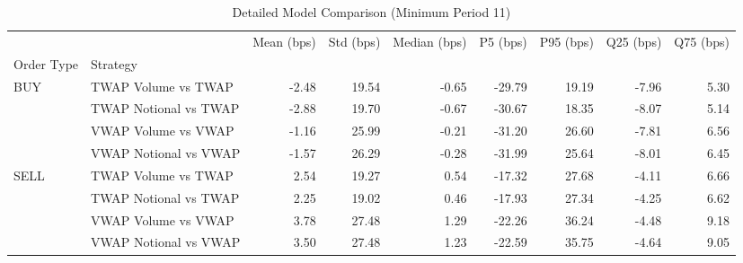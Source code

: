 \begin{table}
\caption{Detailed Model Comparison (Minimum Period 11)}
\label{tab:detailed_min_period_11}
\begin{tabular}{l|l|rrrrrrr}
\toprule
 &  & Mean (bps) & Std (bps) & Median (bps) & P5 (bps) & P95 (bps) & Q25 (bps) & Q75 (bps) \\
Order Type & Strategy &  &  &  &  &  &  &  \\
\midrule
\multirow[t]{4}{*}{BUY} & TWAP Volume vs TWAP & -2.48 & 19.54 & -0.65 & -29.79 & 19.19 & -7.96 & 5.30 \\
 & TWAP Notional vs TWAP & -2.88 & 19.70 & -0.67 & -30.67 & 18.35 & -8.07 & 5.14 \\
 & VWAP Volume vs VWAP & -1.16 & 25.99 & -0.21 & -31.20 & 26.60 & -7.81 & 6.56 \\
 & VWAP Notional vs VWAP & -1.57 & 26.29 & -0.28 & -31.99 & 25.64 & -8.01 & 6.45 \\
\cline{1-9}
\multirow[t]{4}{*}{SELL} & TWAP Volume vs TWAP & 2.54 & 19.27 & 0.54 & -17.32 & 27.68 & -4.11 & 6.66 \\
 & TWAP Notional vs TWAP & 2.25 & 19.02 & 0.46 & -17.93 & 27.34 & -4.25 & 6.62 \\
 & VWAP Volume vs VWAP & 3.78 & 27.48 & 1.29 & -22.26 & 36.24 & -4.48 & 9.18 \\
 & VWAP Notional vs VWAP & 3.50 & 27.48 & 1.23 & -22.59 & 35.75 & -4.64 & 9.05 \\
\cline{1-9}
\bottomrule
\end{tabular}
\end{table}
